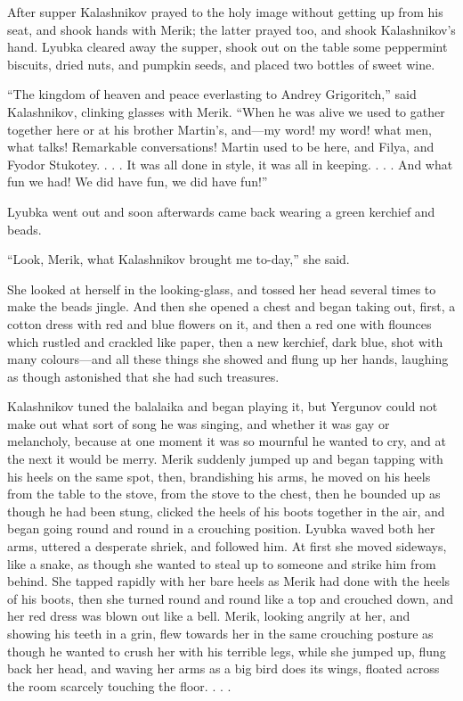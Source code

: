 After supper Kalashnikov prayed to the holy image without getting up
from his seat, and shook hands with Merik; the latter prayed too, and
shook Kalashnikov’s hand. Lyubka cleared away the supper, shook out on
the table some peppermint biscuits, dried nuts, and pumpkin seeds, and
placed two bottles of sweet wine.

“The kingdom of heaven and peace everlasting to Andrey Grigoritch,” said
Kalashnikov, clinking glasses with Merik. “When he was alive we used to
gather together here or at his brother Martin’s, and—my word! my word!
what men, what talks! Remarkable conversations! Martin used to be here,
and Filya, and Fyodor Stukotey. . . . It was all done in style, it was
all in keeping. . . . And what fun we had! We did have fun, we did have
fun!”

Lyubka went out and soon afterwards came back wearing a green kerchief
and beads.

“Look, Merik, what Kalashnikov brought me to-day,” she said.

She looked at herself in the looking-glass, and tossed her head several
times to make the beads jingle. And then she opened a chest and began
taking out, first, a cotton dress with red and blue flowers on it, and
then a red one with flounces which rustled and crackled like paper, then
a new kerchief, dark blue, shot with many colours—and all these things
she showed and flung up her hands, laughing as though astonished that
she had such treasures.

Kalashnikov tuned the balalaika and began playing it, but Yergunov could
not make out what sort of song he was singing, and whether it was gay or
melancholy, because at one moment it was so mournful he wanted to cry,
and at the next it would be merry. Merik suddenly jumped up and began
tapping with his heels on the same spot, then, brandishing his arms, he
moved on his heels from the table to the stove, from the stove to the
chest, then he bounded up as though he had been stung, clicked the heels
of his boots together in the air, and began going round and round in a
crouching position. Lyubka waved both her arms, uttered a desperate
shriek, and followed him. At first she moved sideways, like a snake, as
though she wanted to steal up to someone and strike him from behind. She
tapped rapidly with her bare heels as Merik had done with the heels of
his boots, then she turned round and round like a top and crouched down,
and her red dress was blown out like a bell. Merik, looking angrily at
her, and showing his teeth in a grin, flew towards her in the same
crouching posture as though he wanted to crush her with his terrible
legs, while she jumped up, flung back her head, and waving her arms as a
big bird does its wings, floated across the room scarcely touching the
floor. . . .

